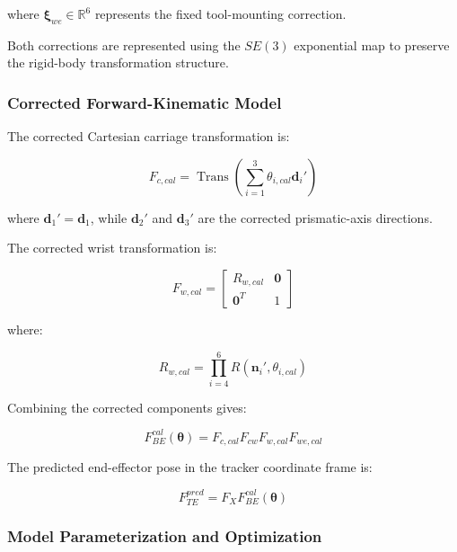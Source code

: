 \documentclass[11pt,letterpaper]{article}
\begin{document}
where $\boldsymbol{\xi}_{we}\in\mathbb{R}^6$
represents the fixed tool-mounting correction.

Both corrections are represented using the
$SE(3)$ exponential map to preserve the
rigid-body transformation structure.


\subsubsection{Corrected Forward-Kinematic Model}

The corrected Cartesian carriage transformation is:

\begin{equation}
F_{c,cal}
=
\operatorname{Trans}
\left(
\sum_{i=1}^{3}
\theta_{i,cal}\mathbf{d}_i'
\right)
\end{equation}

where $\mathbf{d}_1'=\mathbf{d}_1$, while
$\mathbf{d}_2'$ and $\mathbf{d}_3'$ are
the corrected prismatic-axis directions.

The corrected wrist transformation is:

\begin{equation}
F_{w,cal}
=
\begin{bmatrix}
R_{w,cal} & \mathbf{0}\\
\mathbf{0}^T & 1
\end{bmatrix}
\end{equation}

where:

\begin{equation}
R_{w,cal}
=
\prod_{i=4}^{6}
R(\mathbf{n}_i',\theta_{i,cal})
\end{equation}

Combining the corrected components gives:

\begin{equation}
\boxed{
F_{BE}^{cal}(\boldsymbol{\theta})
=
F_{c,cal}
F_{cw}
F_{w,cal}
F_{we,cal}
}
\end{equation}

The predicted end-effector pose in the tracker
coordinate frame is:

\begin{equation}
\boxed{
F_{TE}^{pred}
=
F_XF_{BE}^{cal}(\boldsymbol{\theta})
}
\end{equation}


\subsubsection{Model Parameterization and Optimization}
\end{document}
